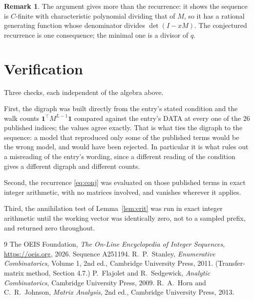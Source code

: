 \documentclass[11pt,a4paper]{article}
\theoremstyle{plain}
\theoremstyle{definition}
\newtheorem{remark}[theorem]{Remark}
\begin{document}
\begin{remark}
The argument gives more than the recurrence: it shows the sequence is $C$-finite with
characteristic polynomial dividing that of $M$, so it has a rational generating function
whose denominator divides $\det(I-xM)$. The conjectured recurrence is one consequence; the
minimal one is a divisor of $q$.
\end{remark}

\section{Verification}

Three checks, each independent of the algebra above.

First, the digraph was built directly from the entry's stated condition and the walk counts
$\mathbf{1}^{\!\top}M^{L-1}\mathbf{1}$ compared against the entry's DATA at
every one of the $26$ published indices; the values agree exactly. That is what ties
the digraph to the sequence: a model that reproduced only some of the published terms would
be the wrong model, and would have been rejected. In particular it is what rules out a
misreading of the entry's wording, since a different reading of the condition gives a
different digraph and different counts.

Second, the recurrence \eqref{eq:conj} was evaluated on those published terms in exact
integer arithmetic, with no matrices involved, and vanishes wherever it applies.

Third, the annihilation test of Lemma~\ref{lem:crit} was run in exact integer arithmetic
until the working vector was identically zero, not to a sampled prefix, and returned zero
throughout.

\begin{thebibliography}{9}
 The OEIS Foundation, \emph{The On-Line Encyclopedia of Integer
Sequences}, \url{https://oeis.org}, 2026. Sequence A251194.
 R.~P.~Stanley, \emph{Enumerative Combinatorics}, Volume 1, 2nd ed.,
Cambridge University Press, 2011. (Transfer-matrix method, Section 4.7.)
 P.~Flajolet and R.~Sedgewick, \emph{Analytic Combinatorics}, Cambridge
University Press, 2009.
 R.~A.~Horn and C.~R.~Johnson, \emph{Matrix Analysis}, 2nd ed., Cambridge
University Press, 2013.
\end{thebibliography}
\end{document}
